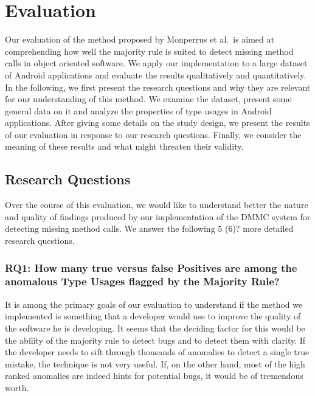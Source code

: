 \chapter{Evaluation}\label{ch:eval}

Our evaluation of the method proposed by Monperrus et al.\ is aimed at comprehending how well the majority rule is suited to detect missing method calls in object oriented software.
We apply our implementation to a large dataset of Android applications and evaluate the results qualitatively and quantitatively.
In the following, we first present the research questions and why they are relevant for our understanding of this method.
We examine the dataset, present some general data on it and analyze the properties of type usages in Android applications.
After giving some details on the study design, we present the results of our evaluation in response to our research questions.
Finally, we consider the meaning of these results and what might threaten their validity.

\section{Research Questions}

Over the course of this evaluation, we would like to understand better the nature and quality of findings produced by our implementation of the $\text{DMMC}$ system for detecting missing method calls.
We answer the following 5 (6)? more detailed research questions.

\subsection{RQ1: How many true versus false Positives are among the anomalous Type Usages flagged by the Majority Rule?}

It is among the primary goals of our evaluation to understand if the method we implemented is something that a developer would use to improve the quality of the software he is developing.
It seems that the deciding factor for this would be the ability of the majority rule to detect bugs and to detect them with clarity.
If the developer needs to sift through thousands of anomalies to detect a single true mistake, the technique is not very useful.
If, on the other hand, most of the high ranked anomalies are indeed hints for potential bugs, it would be of tremendous worth.

